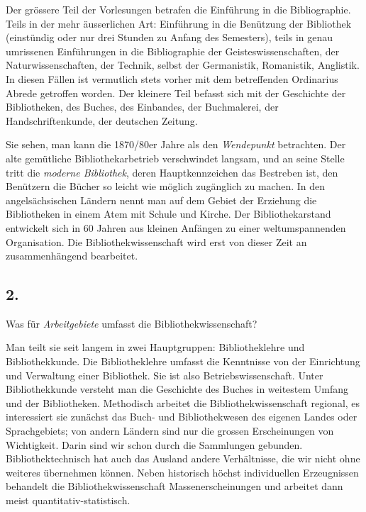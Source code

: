 \documentclass[a4paper,
fontsize=11pt,
oneside,
numbers=noperiodatend,
parskip=half-,
bibliography=totoc,
final
]{scrartcl}
\begin{document}
Der grössere Teil der Vorlesungen betrafen die Einführung in die
Bibliographie. Teils in der mehr äusserlichen Art: Einführung in die
Benützung der Bibliothek (einstündig oder nur drei Stunden zu Anfang des
Semesters), teils in genau umrissenen Einführungen in die Bibliographie
der Geisteswissenschaften, der Naturwissenschaften, der Technik, selbst
der Germanistik, Romanistik, Anglistik. In diesen Fällen ist vermutlich
stets vorher mit dem betreffenden Ordinarius Abrede getroffen worden.
Der kleinere Teil befasst sich mit der Geschichte der Bibliotheken, des
Buches, des Einbandes, der Buchmalerei, der Handschriftenkunde, der
deutschen Zeitung.

Sie sehen, man kann die 1870/80er Jahre als den \emph{Wendepunkt}
betrachten. Der alte gemütliche Bibliothekarbetrieb verschwindet
langsam, und an seine Stelle tritt die \emph{moderne Bibliothek}, deren
Hauptkennzeichen das Bestreben ist, den Benützern die Bücher so leicht
wie möglich zugänglich zu machen. In den angelsächsischen Ländern nennt
man auf dem Gebiet der Erziehung die Bibliotheken in einem Atem mit
Schule und Kirche. Der Bibliothekarstand entwickelt sich in 60 Jahren
aus kleinen Anfängen zu einer weltumspannenden Organisation. Die
Bibliothekwissenschaft wird erst von dieser Zeit an zusammenhängend
bearbeitet.

\hypertarget{section-1}{%
\subsection{2.}\label{section-1}}

Was für \emph{Arbeitgebiete} umfasst die Bibliothekwissenschaft?

Man teilt sie seit langem in zwei Hauptgruppen: Bibliotheklehre und
Bibliothekkunde. Die Bibliotheklehre umfasst die Kenntnisse von der
Einrichtung und Verwaltung einer Bibliothek. Sie ist also
Betriebswissenschaft. Unter Bibliothekkunde versteht man die Geschichte
des Buches in weitestem Umfang und der Bibliotheken. Methodisch arbeitet
die Bibliothekwissenschaft regional, es interessiert sie zunächst das
Buch- und Bibliothekwesen des eigenen Landes oder Sprachgebiets; von
andern Ländern sind nur die grossen Erscheinungen von Wichtigkeit. Darin
sind wir schon durch die Sammlungen gebunden. Bibliothektechnisch hat
auch das Ausland andere Verhältnisse, die wir nicht ohne weiteres
übernehmen können. Neben historisch höchst individuellen Erzeugnissen
behandelt die Bibliothekwissenschaft Massenerscheinungen und arbeitet
dann meist quantitativ-statistisch.
\end{document}

